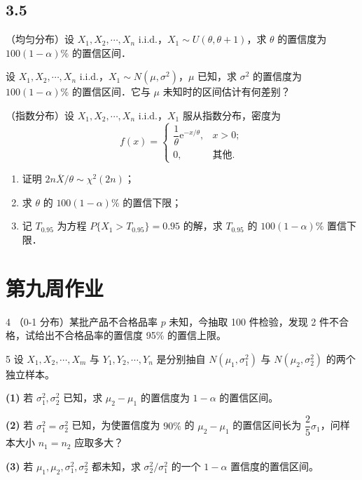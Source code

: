 \subsection{3.5}
\begin{homework}[1]
（均匀分布）设 $X_1, X_2, \cdots, X_n$ i.i.d.，$X_1 \sim U(\theta, \theta+1)$，求 $\theta$ 的置信度为 $100(1-\alpha)\%$ 的置信区间．
\end{homework}

\begin{homework}[2]
设 $X_1, X_2, \cdots, X_n$ i.i.d.，$X_1 \sim N(\mu, \sigma^2)$，$\mu$ 已知，求 $\sigma^2$ 的置信度为 $100(1-\alpha)\%$ 的置信区间．它与 $\mu$ 未知时的区间估计有何差别？
\end{homework}

\begin{homework}[3]
（指数分布）设 $X_1, X_2, \cdots, X_n$ i.i.d.，$X_1$ 服从指数分布，密度为
\[
f(x) = \begin{cases} \dfrac{1}{\theta} \mathrm{e}^{-x/\theta}, & x > 0; \\ 0, & \text{其他}. \end{cases}
\]
\begin{enumerate}[(1)]
    \item 证明 $2n\overline{X}/\theta \sim \chi^2(2n)$；
    \item 求 $\theta$ 的 $100(1-\alpha)\%$ 的置信下限；
    \item 记 $T_{0.95}$ 为方程 $P\{X_1 > T_{0.95}\} = 0.95$ 的解，求 $T_{0.95}$ 的 $100(1-\alpha)\%$ 置信下限．
\end{enumerate}
\end{homework}
\section{第九周作业}
\begin{homework}{4}
（0-1 分布）某批产品不合格品率 $p$ 未知，今抽取 100 件检验，发现 2 件不合格，试给出不合格品率的置信度 95\% 的置信上限。
\end{homework}

\begin{homework}{5}
设 $X_1, X_2, \cdots, X_m$ 与 $Y_1, Y_2, \cdots, Y_n$ 是分别抽自 $N(\mu_1, \sigma_1^2)$ 与 $N(\mu_2, \sigma_2^2)$ 的两个独立样本。

\textbf{(1)} 若 $\sigma_1^2, \sigma_2^2$ 已知，求 $\mu_2 - \mu_1$ 的置信度为 $1-\alpha$ 的置信区间。

\textbf{(2)} 若 $\sigma_1^2 = \sigma_2^2$ 已知，为使置信度为 $90\%$ 的 $\mu_2 - \mu_1$ 的置信区间长为 $\dfrac{2}{5}\sigma_1$，问样本大小 $n_1 = n_2$ 应取多大？

\textbf{(3)} 若 $\mu_1, \mu_2, \sigma_1^2, \sigma_2^2$ 都未知，求 $\sigma_2^2/\sigma_1^2$ 的一个 $1-\alpha$ 置信度的置信区间。
\end{homework}
